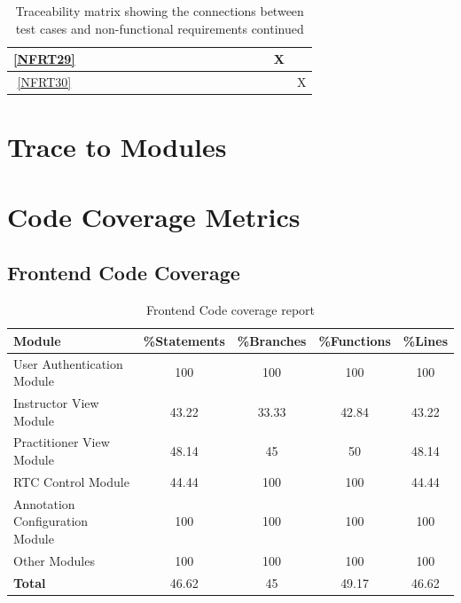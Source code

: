 \documentclass[12pt, titlepage]{article}
\begin{document}
\begin{landscape}
\begin{table}[h!]
\begin{tabular}{|c|c|c|c|c|c|c|c|c|c|c|c|c|c|c|c|c|c|}
      \ref{NFRT29} &      &      &     &     &     &     &     &     &     &     &     &     &     &     &     & X   &     \\ \hline
      \ref{NFRT30} &      &      &     &     &     &     &     &     &     &     &     &     &     &     &     &     & X   \\ \hline
    \end{tabular}
    \caption{Traceability matrix showing the connections between test cases
      and non-functional requirements continued}
    \label{tab:nfrt2}
  \end{table}
\end{landscape}
\restoregeometry

\section{Trace to Modules}

\section{Code Coverage Metrics}

\subsection*{Frontend Code Coverage}

\begin{table}[htbp]
  \centering
  \begin{tabular}{@{}lcccc@{}}
    \toprule
    \textbf{Module}                       & \textbf{\%Statements} & \textbf{\%Branches} & \textbf{\%Functions} & \textbf{\%Lines} \\ \midrule
    User Authentication Module      & 100             & 100           & 100            & 100        \\
    Instructor View Module          & 43.22           & 33.33         & 42.84          & 43.22      \\
    Practitioner View Module        & 48.14           & 45            & 50             & 48.14      \\
    RTC Control Module              & 44.44           & 100           & 100            & 44.44      \\
    Annotation Configuration Module & 100             & 100           & 100            & 100        \\
    Other Modules                   & 100             & 100           & 100            & 100        \\
    \midrule
    \textbf{Total}                        & 46.62           & 45            & 49.17          & 46.62      \\ \bottomrule
  \end{tabular}
  \caption{Frontend Code coverage report}
  \label{tab:frontend-cov}
\end{table}
\end{document}
